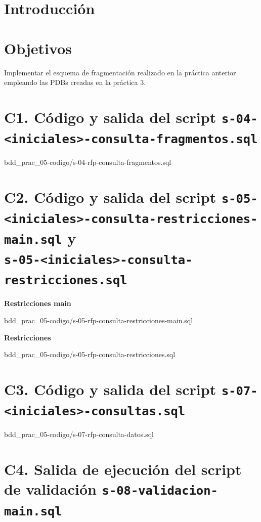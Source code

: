 \documentclass{article}
\begin{document}
\section*{Introducción}

\section*{Objetivos}
Implementar el esquema de fragmentación realizado en la práctica anterior 
empleando las PDBs creadas en la práctica 3.

\section*{C1. Código y salida del script 
    \texttt{s-04-<iniciales>-consulta-fragmentos.sql}}


{bdd_prac_05-codigo/s-04-rfp-consulta-fragmentos.sql}


\section*{C2. Código y salida del script 
\texttt{s-05-<iniciales>-consulta-restricciones-main.sql} y\\
\texttt{s-05-<iniciales>-consulta-restricciones.sql}}

\textbf{Restricciones main}

{bdd_prac_05-codigo/s-05-rfp-consulta-restricciones-main.sql}

\textbf{Restricciones}


{bdd_prac_05-codigo/s-05-rfp-consulta-restricciones.sql}


\section*{C3. Código y salida del script 
\texttt{s-07-<iniciales>-consultas.sql}}


{bdd_prac_05-codigo/s-07-rfp-consulta-datos.sql}


\section*{C4. Salida de ejecución del script de validación 
\texttt{s-08-validacion-main.sql}}            
\end{document}
